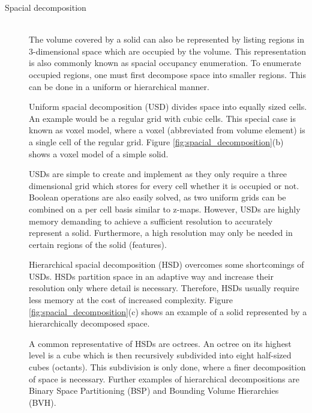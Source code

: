 \begin{description}
	\item[Spacial decomposition] \hfill \\
	The volume covered by a solid can also be represented by listing regions in 3-dimensional space which are occupied by the volume.
	This representation is also commonly known as spacial occupancy enumeration.
	To enumerate occupied regions, one must first decompose space into smaller regions.
	This can be done in a uniform or hierarchical manner.
	
	Uniform spacial decomposition (USD) divides space into equally sized cells.
	An example would be a regular grid with cubic cells.
	This special case is known as voxel model, where a voxel (abbreviated from volume element) is a single cell of the regular grid.
	Figure \ref{fig:spacial_decomposition}(b) shows a voxel model of a simple solid.
	
	USDs are simple to create and implement as they only require a three dimensional grid which stores for every cell whether it is occupied or not.
	Boolean operations are also easily solved, as two uniform grids can be combined on a per cell basis similar to z-maps.
	However, USDs are highly memory demanding to achieve a sufficient resolution to accurately represent a solid.
	Furthermore, a high resolution may only be needed in certain regions of the solid (\ie features).
	
	Hierarchical spacial decomposition (HSD) overcomes some shortcomings of USDs.
	HSDs partition space in an adaptive way and increase their resolution only where detail is necessary.
	Therefore, HSDs usually require less memory at the cost of increased complexity.
	Figure \ref{fig:spacial_decomposition}(c) shows an example of a solid represented by a hierarchically decomposed space.
	
	A common representative of HSDs are octrees.
	An octree on its highest level is a cube which is then recursively subdivided into eight half-sized cubes (\aka octants).
	This subdivision is only done, where a finer decomposition of space is necessary.
	Further examples of hierarchical decompositions are Binary Space Partitioning (BSP) and Bounding Volume Hierarchies (BVH).
	

\end{description}
